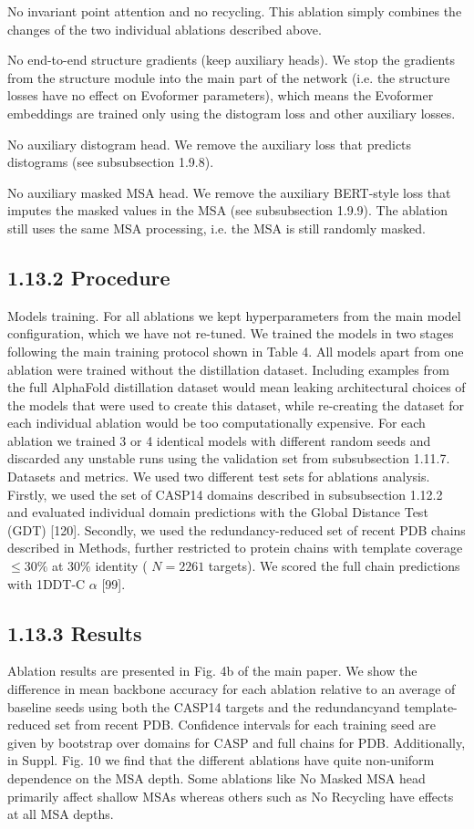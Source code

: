 \documentclass[10pt]{article}
\begin{document}
No invariant point attention and no recycling. This ablation simply combines the changes of the two individual ablations described above.

No end-to-end structure gradients (keep auxiliary heads). We stop the gradients from the structure module into the main part of the network (i.e. the structure losses have no effect on Evoformer parameters), which means the Evoformer embeddings are trained only using the distogram loss and other auxiliary losses.

No auxiliary distogram head. We remove the auxiliary loss that predicts distograms (see subsubsection 1.9.8).

No auxiliary masked MSA head. We remove the auxiliary BERT-style loss that imputes the masked values in the MSA (see subsubsection 1.9.9). The ablation still uses the same MSA processing, i.e. the MSA is still randomly masked.

\subsection*{1.13.2 Procedure}
Models training. For all ablations we kept hyperparameters from the main model configuration, which we have not re-tuned. We trained the models in two stages following the main training protocol shown in Table 4. All models apart from one ablation were trained without the distillation dataset. Including examples from the full AlphaFold distillation dataset would mean leaking architectural choices of the models that were used to create this dataset, while re-creating the dataset for each individual ablation would be too computationally expensive. For each ablation we trained 3 or 4 identical models with different random seeds and discarded any unstable runs using the validation set from subsubsection 1.11.7.\\[0pt]
Datasets and metrics. We used two different test sets for ablations analysis. Firstly, we used the set of CASP14 domains described in subsubsection 1.12.2 and evaluated individual domain predictions with the Global Distance Test (GDT) [120]. Secondly, we used the redundancy-reduced set of recent PDB chains described in Methods, further restricted to protein chains with template coverage $\leq 30 \%$ at $30 \%$ identity ( $N=2261$ targets). We scored the full chain predictions with 1DDT-C $\alpha$ [99].

\subsection*{1.13.3 Results}
Ablation results are presented in Fig. 4b of the main paper. We show the difference in mean backbone accuracy for each ablation relative to an average of baseline seeds using both the CASP14 targets and the redundancyand template-reduced set from recent PDB. Confidence intervals for each training seed are given by bootstrap over domains for CASP and full chains for PDB. Additionally, in Suppl. Fig. 10 we find that the different ablations have quite non-uniform dependence on the MSA depth. Some ablations like No Masked MSA head primarily affect shallow MSAs whereas others such as No Recycling have effects at all MSA depths.
\end{document}
